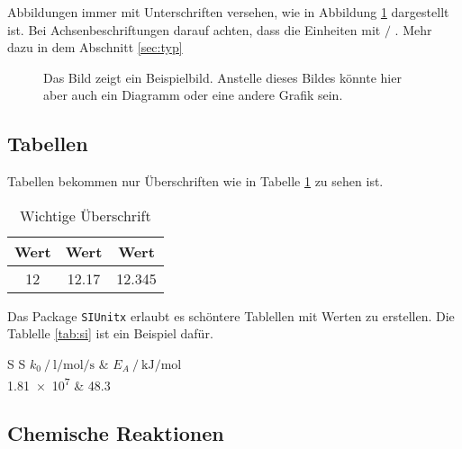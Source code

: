 Abbildungen immer mit Unterschriften versehen, wie in Abbildung \ref{fig:example_a} dargestellt ist. 
Bei Achsenbeschriftungen darauf achten, dass die Einheiten mit \(\mathbin{/}\) .
Mehr dazu in dem Abschnitt \ref{sec:typ} 

\begin{figure}[h] 
    \centering
    \caption{Das Bild zeigt ein Beispielbild. Anstelle dieses Bildes könnte hier aber auch ein Diagramm oder eine andere Grafik sein.}
    \label{fig:example_a} %
\end{figure}

\FloatBarrier

\subsection{Tabellen}
Tabellen bekommen nur Überschriften wie in Tabelle \ref{tab:use} zu sehen ist.

\begin{table}[h]
	\centering
	\caption{Wichtige Überschrift}
	\begin{tabular}{c|c c}
		Wert & Wert & Wert \\
		\hline
		\num{12} &  \num{12,17}& \num{12,345} \\
		\hline		
	\end{tabular}
	\label{tab:use}	
\end{table}

Das Package \texttt{SIUnitx} \cite{SIUnitx} erlaubt es schöntere Tablellen mit Werten zu erstellen. Die Tablelle \ref{tab:si} ist ein Beispiel dafür.

\begin{table}[h]
	\centering
	\caption{Tabelle mit \texttt{SIUnitx}}
	\begin{tabular}{S S}
		\toprule
		{$k_0 \mathbin{/} \unit{\litre\per\mole\per\second}$} & {$E_A \mathbin{/} \unit{\kilo\joule\per\mole}$} \\
		\midrule
		\num{1,81 e7} & \num{48,3} \\
		\bottomrule
	\end{tabular}
	\label{tab:si}	
\end{table}

\subsection{Chemische Reaktionen}

